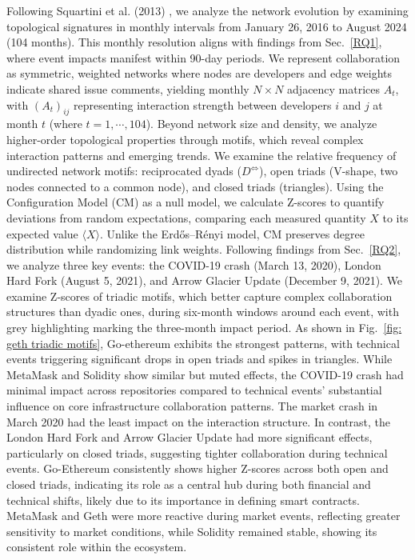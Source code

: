 Following Squartini et al. (2013) \cite{squartini2013early}, we analyze the network evolution by examining topological signatures in monthly intervals from January 26, 2016 to August 2024 (104 months). This monthly resolution aligns with findings from Sec.~\ref{RQ1}, where event impacts manifest within 90-day periods. We represent collaboration as symmetric, weighted networks where nodes are developers and edge weights indicate shared issue comments, yielding monthly $N \times N$ adjacency matrices $A_t$, with $(A_t)_{ij}$ representing interaction strength between developers $i$ and $j$ at month $t$ (where $t = 1, \cdots, 104$).
Beyond network size and density, we analyze higher-order topological properties through motifs, which reveal complex interaction patterns and emerging trends. We examine the relative frequency of undirected network motifs: reciprocated dyads (\(D^{\Leftrightarrow}\)), open triads (V-shape, two nodes connected to a common node), and closed triads (triangles). Using the Configuration Model (CM) as a null model, we calculate Z-scores to quantify deviations from random expectations, comparing each measured quantity $X$ to its expected value $\langle X \rangle$. 
Unlike the Erdős–Rényi model, CM preserves degree distribution while randomizing link weights.
Following findings from Sec.~\ref{RQ2}, we analyze three key events: the COVID-19 crash (March 13, 2020), London Hard Fork (August 5, 2021), and Arrow Glacier Update (December 9, 2021). We examine Z-scores of triadic motifs, which better capture complex collaboration structures than dyadic ones, during six-month windows around each event, with grey highlighting marking the three-month impact period. 
As shown in Fig.~\ref{fig: geth triadic motifs}, Go-ethereum exhibits the strongest patterns, with technical events triggering significant drops in open triads and spikes in triangles. 
While MetaMask and Solidity show similar but muted effects, the COVID-19 crash had minimal impact across repositories compared to technical events' substantial influence on core infrastructure collaboration patterns. The market crash in March 2020 had the least impact on the interaction structure. In contrast, the London Hard Fork and Arrow Glacier Update had more significant effects, particularly on closed triads, suggesting tighter collaboration during technical events. 
Go-Ethereum consistently shows higher Z-scores across both open and closed triads, indicating its role as a central hub during both financial and technical shifts, likely due to its importance in defining smart contracts. MetaMask and Geth were more reactive during market events, reflecting greater sensitivity to market conditions, while Solidity remained stable, showing its consistent role within the ecosystem.







